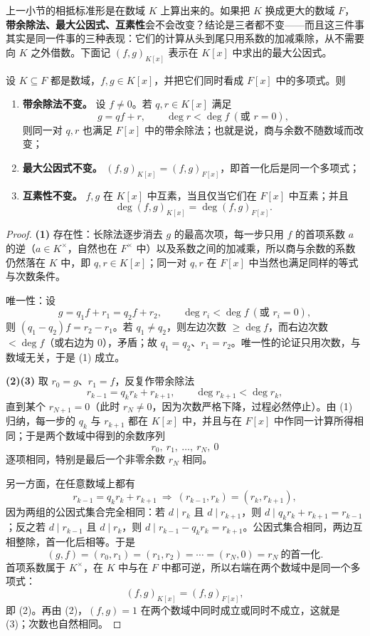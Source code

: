 \noindent 上一小节的相抵标准形是在数域 \(K\) 上算出来的。如果把 \(K\) 换成更大的数域 \(F\)，\textbf{带余除法、最大公因式、互素性}会不会改变？结论是三者都不变——而且这三件事其实是同一件事的三种表现：它们的计算从头到尾只用系数的加减乘除，从不需要向 \(K\) 之外借数。下面记 \((f,g)_{K[x]}\) 表示在 \(K[x]\) 中求出的最大公因式。

\begin{theorem}
设 \(K\subseteq F\) 都是数域，\(f,g\in K[x]\)，并把它们同时看成 \(F[x]\) 中的多项式。则
\begin{enumerate}[label=(\arabic*)]
  \item \textbf{带余除法不变。} 设 \(f\ne0\)。若 \(q,r\in K[x]\) 满足
  \[
  g=qf+r,\qquad \deg r<\deg f\ (\text{或 }r=0),
  \]
  则同一对 \(q,r\) 也满足 \(F[x]\) 中的带余除法；也就是说，商与余数不随数域而改变；
  \item \textbf{最大公因式不变。} \((f,g)_{K[x]}=(f,g)_{F[x]}\)，即首一化后是同一个多项式；
  \item \textbf{互素性不变。} \(f,g\) 在 \(K[x]\) 中互素，当且仅当它们在 \(F[x]\) 中互素；并且
  \[
  \deg(f,g)_{K[x]}=\deg(f,g)_{F[x]} .
  \]
\end{enumerate}
\end{theorem}

\begin{proof}
\textbf{(1)} 存在性：长除法逐步消去 \(g\) 的最高次项，每一步只用 \(f\) 的首项系数 \(a\) 的逆（\(a\in K^\times\)，自然也在 \(F^\times\) 中）以及系数之间的加减乘，所以商与余数的系数仍然落在 \(K\) 中，即 \(q,r\in K[x]\)；同一对 \(q,r\) 在 \(F[x]\) 中当然也满足同样的等式与次数条件。

唯一性：设
\[
g=q_1f+r_1=q_2f+r_2,\qquad \deg r_i<\deg f\ (\text{或 }r_i=0),
\]
则 \((q_1-q_2)f=r_2-r_1\)。若 \(q_1\ne q_2\)，则左边次数 \(\ge\deg f\)，而右边次数 \(<\deg f\)（或右边为 \(0\)），矛盾；故 \(q_1=q_2\)、\(r_1=r_2\)。唯一性的论证只用次数，与数域无关，于是 (1) 成立。

\textbf{(2)(3)} 取 \(r_0=g\)、\(r_1=f\)，反复作带余除法
\[
r_{k-1}=q_kr_k+r_{k+1},\qquad \deg r_{k+1}<\deg r_k,
\]
直到某个 \(r_{N+1}=0\)（此时 \(r_N\ne0\)，因为次数严格下降，过程必然停止）。由 (1) 归纳，每一步的 \(q_k\) 与 \(r_{k+1}\) 都在 \(K[x]\) 中，并且与在 \(F[x]\) 中作同一计算所得相同；于是两个数域中得到的余数序列
\[
r_0,\ r_1,\ \dots,\ r_N,\ 0
\]
逐项相同，特别是最后一个非零余数 \(r_N\) 相同。

另一方面，在任意数域上都有
\[
r_{k-1}=q_kr_k+r_{k+1}\ \Longrightarrow\ (r_{k-1},r_k)=(r_k,r_{k+1}),
\]
因为两组的公因式集合完全相同：若 \(d\mid r_k\) 且 \(d\mid r_{k+1}\)，则 \(d\mid q_kr_k+r_{k+1}=r_{k-1}\)；反之若 \(d\mid r_{k-1}\) 且 \(d\mid r_k\)，则 \(d\mid r_{k-1}-q_kr_k=r_{k+1}\)。公因式集合相同，两边互相整除，首一化后相等。于是
\[
(g,f)=(r_0,r_1)=(r_1,r_2)=\cdots=(r_N,0)=r_N\ \text{的首一化}.
\]
首项系数属于 \(K^\times\)，在 \(K\) 中与在 \(F\) 中都可逆，所以右端在两个数域中是同一个多项式：
\[
(f,g)_{K[x]}=(f,g)_{F[x]},
\]
即 (2)。再由 (2)，\((f,g)=1\) 在两个数域中同时成立或同时不成立，这就是 (3)；次数也自然相同。
\end{proof}


